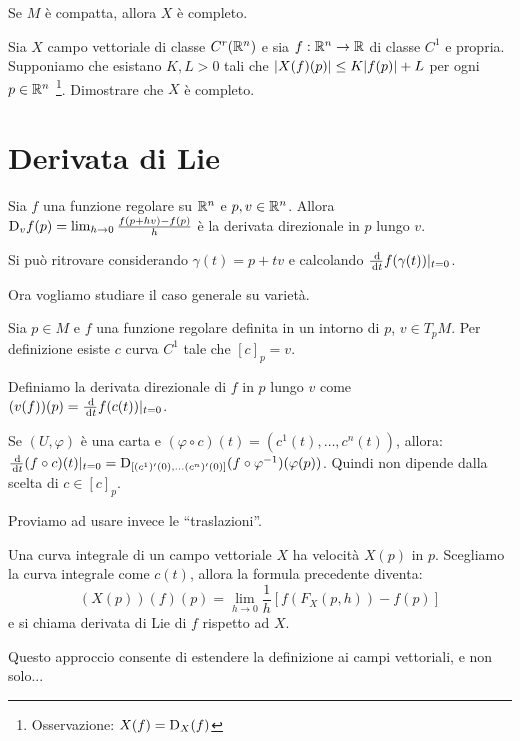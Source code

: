 \begin{corollary}
	Se $M$ è compatta, allora $X$ è completo.
\end{corollary}


\begin{exercise}
	Sia $X$ campo vettoriale di classe $C^r(\mathbb R^n)$ e sia $f:\mathbb R^n\to \mathbb R$ di classe $C^1$ e propria. Supponiamo che esistano $K,L>0$ tali che $\lvert X(f)(p)\rvert\le K\lvert f(p)\rvert+L$ per ogni $p\in\mathbb R^n$ \footnote{Osservazione: $X(f)=\mathrm D_X(f)$}. Dimostrare che $X$ è completo.
\end{exercise}


\section{Derivata di Lie}
Sia $f$ una funzione regolare su $\mathbb R^n$ e $p,v\in\mathbb R^n$. Allora $\mathrm D_vf(p)=\lim_{h\to 0} \frac{f(p+hv)-f(p)}h$ è la derivata direzionale in $p$ lungo $v$.

Si può ritrovare considerando $\gamma(t)=p+tv$ e calcolando $\frac {\,\mathrm d}{\,\mathrm d t} f(\gamma(t))|_{t=0}$.

Ora vogliamo studiare il caso generale su varietà.

Sia $p\in M$ e $f$ una funzione regolare definita in un intorno di $p$, $v \in T_{p}M$. Per definizione esiste $c$ curva $C^1$ tale che $[c]_p=v$.

\begin{definition}
	Definiamo la derivata direzionale di $f$ in $p$ lungo $v$ come \\ $(v(f))(p)=\frac {\,\mathrm d} {\,\mathrm d t} f(c(t))|_{t=0}$.
\end{definition}

Se $(U,\varphi)$ è una carta e $(\varphi\circ c)(t)=(c^1(t),\ldots,c^n(t))$, allora: \\
$\frac {\,\mathrm d}{\,\mathrm d t} (f\circ c)(t)|_{t=0}=\mathrm D_{[(c^1)'(0),\ldots(c^n)'(0)]}(f\circ\varphi^{-1})(\varphi(p))$. Quindi non dipende dalla scelta di $c\in[c]_p$.

Proviamo ad usare invece le ``traslazioni''.

Una curva integrale di un campo vettoriale $X$ ha velocità $X(p)$ in $p$. Scegliamo la curva integrale come $c(t)$, allora la formula precedente diventa:
\begin{equation*}
	(X(p))(f)(p)=\lim_{h\to 0} \frac 1h [f(F_X(p,h))-f(p)]
\end{equation*}
e si chiama derivata di Lie di $f$ rispetto ad $X$.

Questo approccio consente di estendere la definizione ai campi vettoriali, e non solo...


